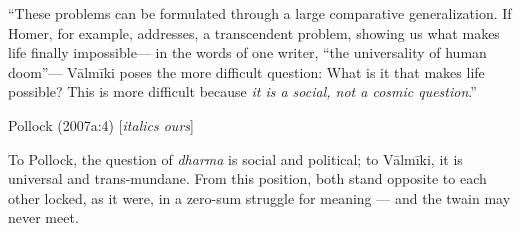 \begin{myquote}
“These problems can be formulated through a large comparative generalization. If Homer, for example, addresses, a transcendent problem, showing us what makes life finally impossible— in the words of one writer, “the universality of human doom”— Vālmīki poses the more difficult question: What is it that makes life possible? This is more difficult because {\sl it is a social, not a cosmic question}.” 

\hfill Pollock (2007a:4) [{\sl italics ours}]
\end{myquote}

To Pollock, the question of {\sl dharma} is social and political; to Vālmīki, it is universal and trans-mundane. From this position, both stand opposite to each other locked, as it were, in a zero-sum struggle for meaning — and the twain may never meet. 


\theendnotes

\newpage

\thispagestyle{plain}


